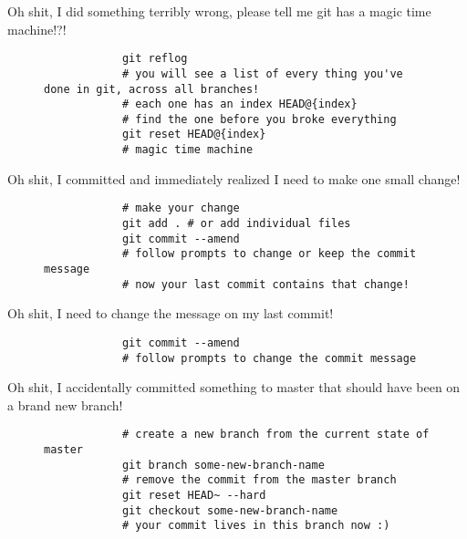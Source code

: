 \begin{frame}[fragile]{Oh shit, I did something terribly wrong, please tell me git has a magic time machine!?!}
    \begin{figure}
        \begin{lstlisting}
            git reflog
            # you will see a list of every thing you've done in git, across all branches!
            # each one has an index HEAD@{index}
            # find the one before you broke everything
            git reset HEAD@{index}
            # magic time machine
        \end{lstlisting}
    \end{figure}
\end{frame}

\begin{frame}[fragile]{Oh shit, I committed and immediately realized I need to make one small change!}
    \begin{figure}
        \begin{lstlisting}
            # make your change
            git add . # or add individual files
            git commit --amend
            # follow prompts to change or keep the commit message
            # now your last commit contains that change!
        \end{lstlisting}
    \end{figure}
\end{frame}

\begin{frame}[fragile]{Oh shit, I need to change the message on my last commit!}
    \begin{figure}
        \begin{lstlisting}
            git commit --amend
            # follow prompts to change the commit message
        \end{lstlisting}
    \end{figure}
\end{frame}

\begin{frame}[fragile]{Oh shit, I accidentally committed something to master that should have been on a brand new branch!}
    \begin{figure}
        \begin{lstlisting}
            # create a new branch from the current state of master
            git branch some-new-branch-name
            # remove the commit from the master branch
            git reset HEAD~ --hard
            git checkout some-new-branch-name
            # your commit lives in this branch now :)
        \end{lstlisting}
    \end{figure}
\end{frame}

